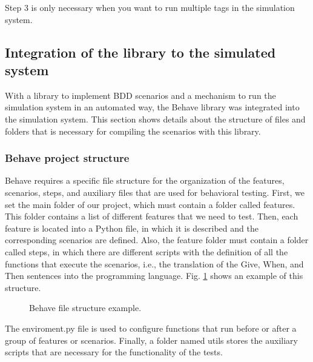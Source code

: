 \documentclass[journal]{IEEEtran}	%
\begin{document}
Step 3 is only necessary when you want to run multiple tags in the simulation system.


\subsection{Integration of the library to the simulated system}


With a library to implement BDD scenarios and a mechanism to run the simulation system in an automated way, the Behave library was integrated into the simulation system. This section shows details about the structure of files and folders that is  necessary for compiling the scenarios with this library.


\subsubsection{Behave project structure}

Behave requires a specific file structure for the organization of the features, scenarios, steps, and auxiliary files that are used for behavioral testing. First, we set the main folder of our project, which must contain a folder called features. This folder contains a list of different features that we need to test. Then, each feature is located into a Python file, in which it is described and the corresponding scenarios are defined. Also, the feature folder must contain a folder called steps, in which there are different scripts with the definition of all the functions that execute the scenarios, i.e., the translation of the Give, When, and Then sentences into the programming language. Fig. \ref{fig:dirtree1} shows an example of this structure.

\begin{figure}[t!]
    \caption{Behave file structure example.}
    \label{fig:dirtree1}
\end{figure}

The enviroment.py file is used to configure functions that run before or after a group of features or scenarios. Finally, a folder named utils stores the auxiliary scripts that are necessary for the functionality of the tests.
\end{document}
